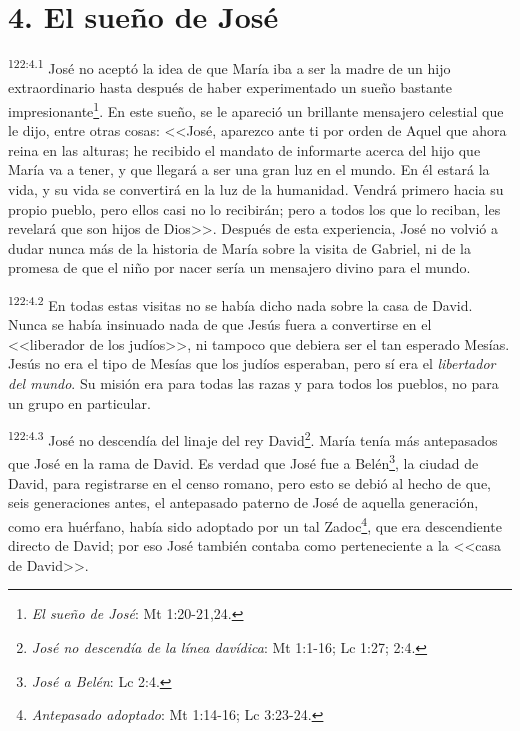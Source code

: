 \section*{4. El sueño de José}
\par 
\textsuperscript{122:4.1} José no aceptó la idea de que María iba a ser la madre de un hijo extraordinario hasta después de haber experimentado un sueño bastante impresionante\footnote{\textit{El sueño de José}: Mt 1:20-21,24.}. En este sueño, se le apareció un brillante mensajero celestial que le dijo, entre otras cosas: <<José, aparezco ante ti por orden de Aquel que ahora reina en las alturas; he recibido el mandato de informarte acerca del hijo que María va a tener, y que llegará a ser una gran luz en el mundo. En él estará la vida, y su vida se convertirá en la luz de la humanidad. Vendrá primero hacia su propio pueblo, pero ellos casi no lo recibirán; pero a todos los que lo reciban, les revelará que son hijos de Dios>>. Después de esta experiencia, José no volvió a dudar nunca más de la historia de María sobre la visita de Gabriel, ni de la promesa de que el niño por nacer sería un mensajero divino para el mundo.

\par 
\textsuperscript{122:4.2} En todas estas visitas no se había dicho nada sobre la casa de David. Nunca se había insinuado nada de que Jesús fuera a convertirse en el <<liberador de los judíos>>, ni tampoco que debiera ser el tan esperado Mesías. Jesús no era el tipo de Mesías que los judíos esperaban, pero sí era el \textit{libertador del mundo}. Su misión era para todas las razas y para todos los pueblos, no para un grupo en particular.

\par 
\textsuperscript{122:4.3} José no descendía del linaje del rey David\footnote{\textit{José no descendía de la línea davídica}: Mt 1:1-16; Lc 1:27; 2:4.}. María tenía más antepasados que José en la rama de David. Es verdad que José fue a Belén\footnote{\textit{José a Belén}: Lc 2:4.}, la ciudad de David, para registrarse en el censo romano, pero esto se debió al hecho de que, seis generaciones antes, el antepasado paterno de José de aquella generación, como era huérfano, había sido adoptado por un tal Zadoc\footnote{\textit{Antepasado adoptado}: Mt 1:14-16; Lc 3:23-24.}, que era descendiente directo de David; por eso José también contaba como perteneciente a la <<casa de David>>.

